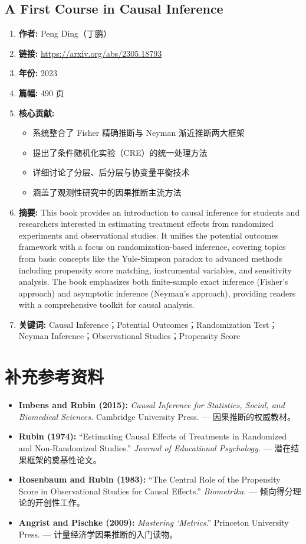 \subsection{A First Course in Causal Inference}
\begin{enumerate}
    \item \textbf{作者:} Peng Ding（丁鹏）
    \item \textbf{链接:} \url{https://arxiv.org/abs/2305.18793}
    \item \textbf{年份:} 2023
    \item \textbf{篇幅:} 490 页
    \item \textbf{核心贡献:}
        \begin{itemize}
            \item 系统整合了 Fisher 精确推断与 Neyman 渐近推断两大框架
            \item 提出了条件随机化实验（CRE）的统一处理方法
            \item 详细讨论了分层、后分层与协变量平衡技术
            \item 涵盖了观测性研究中的因果推断主流方法
        \end{itemize}
    \item \textbf{摘要:} This book provides an introduction to causal inference for students and researchers interested in estimating treatment effects from randomized experiments and observational studies. It unifies the potential outcomes framework with a focus on randomization-based inference, covering topics from basic concepts like the Yule-Simpson paradox to advanced methods including propensity score matching, instrumental variables, and sensitivity analysis. The book emphasizes both finite-sample exact inference (Fisher's approach) and asymptotic inference (Neyman's approach), providing readers with a comprehensive toolkit for causal analysis.
    \item \textbf{关键词:} Causal Inference；Potential Outcomes；Randomization Test；Neyman Inference；Observational Studies；Propensity Score
\end{enumerate}

\section{补充参考资料}

\begin{itemize}
    \item \textbf{Imbens and Rubin (2015):} \textit{Causal Inference for Statistics, Social, and Biomedical Sciences.} Cambridge University Press. — 因果推断的权威教材。
    \item \textbf{Rubin (1974):} ``Estimating Causal Effects of Treatments in Randomized and Non-Randomized Studies.'' \textit{Journal of Educational Psychology.} — 潜在结果框架的奠基性论文。
    \item \textbf{Rosenbaum and Rubin (1983):} ``The Central Role of the Propensity Score in Observational Studies for Causal Effects.'' \textit{Biometrika.} — 倾向得分理论的开创性工作。
    \item \textbf{Angrist and Pischke (2009):} \textit{Mastering `Metrics}.'' Princeton University Press. — 计量经济学因果推断的入门读物。
\end{itemize}

